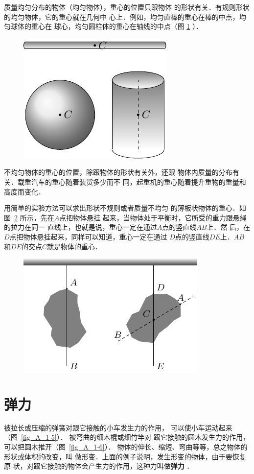     质量均匀分布的物体（均匀物体），重心的位置只跟物体
的形状有关．有规则形状的均匀物体，它的重心就在几何中
心上．例如，均匀直棒的重心在棒的中点，均匀球体的重心在
球心，均匀圆柱体的重心在轴线的中点（图 \ref{fig_A_1-3} ）．

 \begin{figure} [htp]\centering
\includegraphics{fig/A/1-3.pdf} 
\caption{} \label{fig_A_1-3} 
 \end{figure} 

    不均匀物体的重心的位置，除跟物体的形状有关外，还跟
物体内质量的分布有关．载重汽车的重心随着装货多少而不
同，起重机的重心随着提升重物的重量和高度而变化．

    用简单的实验方法可以求出形状不规则或者质量不均匀
的薄板状物体的重心．如图~\ref{fig_A_1-4} 所示，先在$A$点把物体悬挂
起来，当物体处于平衡时，它所受的重力跟悬绳的拉力在同一
直线上，也就是说，重心一定在通过$A$点的竖直线$AB$上．然
后，在$D$点把物体悬挂起来，同样可以知道，重心一定在通过
$D$点的竖直线$DE$上．$AB$和$DE$的交点$C$就是物体的重心．


\begin{figure} [htp]
\centering
\includegraphics{fig/A/1-4.pdf} 
\caption{} \label{fig_A_1-4} 
\end{figure} 

\section{弹力} 
被拉长或压缩的弹簧对跟它接触的小车发生力的作用，
可以使小车运动起来（图~\ref{fig_A_1-5}）．
被弯曲的细木棍或细竹竿对
跟它接触的圆木发生力的作用，可以把圆木推开（图~\ref{fig_A_1-6}）．
物体的伸长、缩短、弯曲等等，总之物体的形状或体积的改变，叫
做形变．上面的例子说明，发生形变的物体，由于要恢复原
状，对跟它接触的物体会产生力的作用，这种力叫做\textbf{弹力} ．

